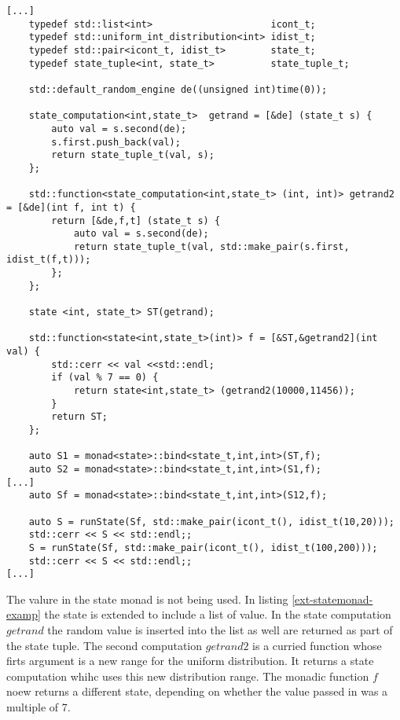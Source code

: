 \documentclass[12pt,fleqn]{article}
\begin{document}
%
%
%
\begin{minipage}{\linewidth}
\begin{lstlisting}[caption=extended state monad example, label=ext-statemonad-examp]
[...]
	typedef std::list<int>                     icont_t;
	typedef std::uniform_int_distribution<int> idist_t;
	typedef std::pair<icont_t, idist_t>        state_t;
	typedef state_tuple<int, state_t>          state_tuple_t;

	std::default_random_engine de((unsigned int)time(0));

	state_computation<int,state_t>  getrand = [&de] (state_t s) {
		auto val = s.second(de);
		s.first.push_back(val);
		return state_tuple_t(val, s);
 	}; 
	
	std::function<state_computation<int,state_t> (int, int)> getrand2 = [&de](int f, int t) {
		return [&de,f,t] (state_t s) {
			auto val = s.second(de);
			return state_tuple_t(val, std::make_pair(s.first, idist_t(f,t)));
		}; 
	};

	state <int, state_t> ST(getrand);

	std::function<state<int,state_t>(int)> f = [&ST,&getrand2](int val) {
		std::cerr << val <<std::endl; 
		if (val % 7 == 0) {
			return state<int,state_t> (getrand2(10000,11456));
		}
		return ST;
	};

	auto S1 = monad<state>::bind<state_t,int,int>(ST,f);
	auto S2 = monad<state>::bind<state_t,int,int>(S1,f);
[...]
	auto Sf = monad<state>::bind<state_t,int,int>(S12,f);

	auto S = runState(Sf, std::make_pair(icont_t(), idist_t(10,20)));
	std::cerr << S << std::endl;;
	S = runState(Sf, std::make_pair(icont_t(), idist_t(100,200)));
	std::cerr << S << std::endl;;
[...]
\end{lstlisting}
\end{minipage}
%
%
%


The valure in the state monad is not being used. 
In listing \ref{ext-statemonad-examp} the state is extended to include a list of value.
In the state computation $getrand$ the random value is inserted into the list as well are returned as part of the state tuple.
The second computation $getrand2$ is a curried function whose firts argument is a new range for the uniform distribution.
It returns a state computation whihc uses this new distribution range.
The monadic function $f$ noew returns a different state, depending on whether the value passed in was a multiple of 7.



%
%
\end{document}
